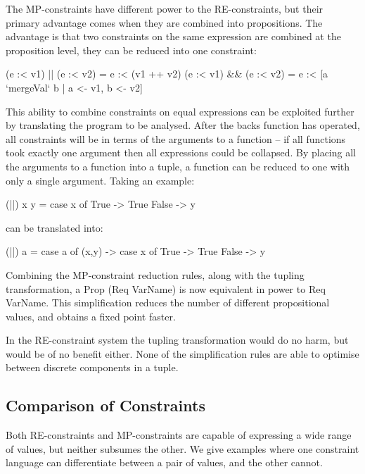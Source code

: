 \documentclass[preprint]{sigplanconf}
\newcommand{\C}[1]{\textsf{#1}}
\begin{document}
The MP-constraints have different power to the RE-constraints, but their primary advantage comes when they are combined into propositions. The advantage is that two constraints on the same expression are combined at the proposition level, they can be reduced into one constraint:

\begin{code}
(e :< v1) || (e :< v2) = e :< (v1 ++ v2)
(e :< v1) && (e :< v2) = e :< [a `mergeVal` b | a <- v1, b <- v2]
\end{code}

This ability to combine constraints on equal expressions can be exploited further by translating the program to be analysed. After the \C{backs} function has operated, all constraints will be in terms of the arguments to a function -- if all functions took exactly one argument then all expressions could be collapsed. By placing all the arguments to a function into a tuple, a function can be reduced to one with only a single argument. Taking an example:

\begin{code}
(||) x y = case  x of
                 True   -> True
                 False  -> y
\end{code}

\noindent can be translated into:

\begin{code}
(||) a = case  a of
               (x,y) -> case  x of
                              True    -> True
                              False   -> y
\end{code}

Combining the MP-constraint reduction rules, along with the tupling transformation, a \C{Prop (Req VarName)} is now equivalent in power to \C{Req VarName}. This simplification reduces the number of different propositional values, and obtains a fixed point faster.

In the RE-constraint system the tupling transformation would do no harm, but would be of no benefit either. None of the simplification rules are able to optimise between discrete components in a tuple.

\subsection{Comparison of Constraints}

Both RE-constraints and MP-constraints are capable of expressing a wide range of values, but neither subsumes the other. We give examples where one constraint language can differentiate between a pair of values, and the other cannot.
\end{document}
